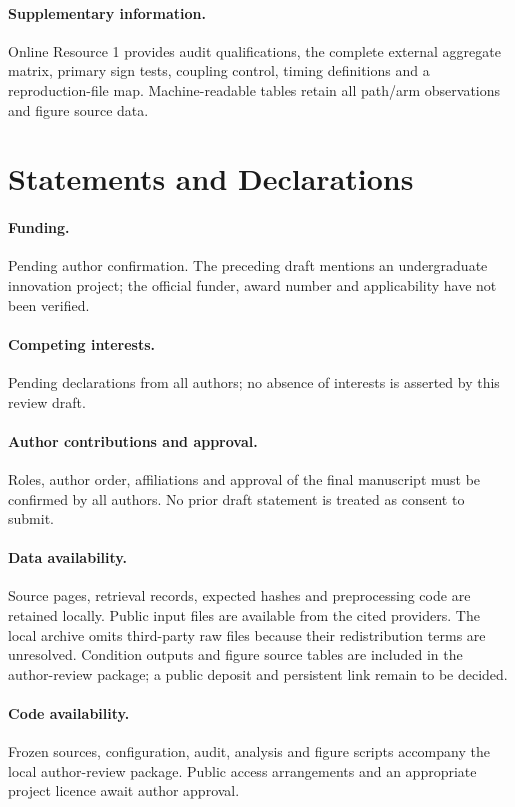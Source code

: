 \documentclass[smallextended]{svjour3}
\begin{document}
\paragraph{Supplementary information.} Online Resource 1 provides audit qualifications, the complete external aggregate matrix, primary sign tests, coupling control, timing definitions and a reproduction-file map. Machine-readable tables retain all path/arm observations and figure source data.
\section*{Statements and Declarations}
\paragraph{Funding.} Pending author confirmation. The preceding draft mentions an undergraduate innovation project; the official funder, award number and applicability have not been verified.
\paragraph{Competing interests.} Pending declarations from all authors; no absence of interests is asserted by this review draft.
\paragraph{Author contributions and approval.} Roles, author order, affiliations and approval of the final manuscript must be confirmed by all authors. No prior draft statement is treated as consent to submit.
\paragraph{Data availability.} Source pages, retrieval records, expected hashes and preprocessing code are retained locally. Public input files are available from the cited providers. The local archive omits third-party raw files because their redistribution terms are unresolved. Condition outputs and figure source tables are included in the author-review package; a public deposit and persistent link remain to be decided.
\paragraph{Code availability.} Frozen sources, configuration, audit, analysis and figure scripts accompany the local author-review package. Public access arrangements and an appropriate project licence await author approval.

\end{document}
